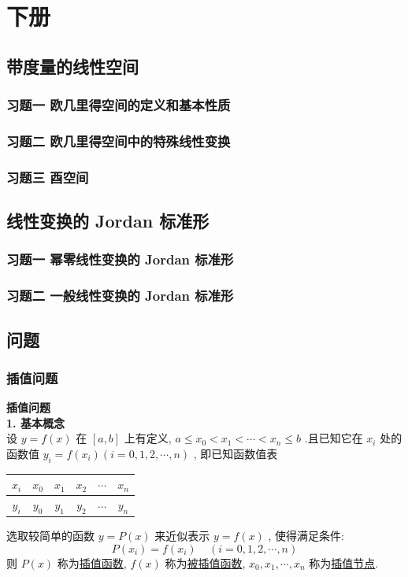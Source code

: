 \documentclass[11pt,a4paper,openany,oneside]{book}
\begin{document}
\part{下册}

\chapter{带度量的线性空间}
\section{习题一 \quad 欧几里得空间的定义和基本性质}	
\section{习题二 \quad 欧几里得空间中的特殊线性变换}
\section{习题三 \quad 酉空间}

\chapter{线性变换的 Jordan 标准形}
\section{习题一 \quad 幂零线性变换的 Jordan 标准形}	
\section{习题二 \quad 一般线性变换的 Jordan 标准形}

\chapter{问题}
\section{插值问题}
\textbf{\large{插值问题}} \\
\textbf{1. 基本概念} \\ 
设 $ y=f(x) $ 在 $ [a,b] $ 上有定义,  $ a \leq x_0 < x_1 < \cdots < x_n \leq b $ .且已知它在 $ x_i $ 处的函数值 $ y_i = f(x_i) (i=0, 1, 2, \cdots, n) $ , 即已知函数值表
\begin{center}
	\begin{tabular}{c|ccccc}
		 $ x_i $  &  $ x_0 $  &  $ x_1 $  &  $ x_2 $  &  $ \cdots $  &  $ x_n $  \\
		\hline
		 $ y_i $  &  $ y_0 $  &  $ y_1 $  &  $ y_2 $  &  $ \cdots $  &  $ y_n $  \\
	\end{tabular}
\end{center}
选取较简单的函数 $ y = P(x) $ 来近似表示 $ y = f(x) $ , 使得满足条件:
 $$  P(x_i) = f(x_i) \ \ \ \ \ (i = 0, 1, 2, \cdots, n)  $$ 
则 $ P(x) $ 称为\underline{插值函数},  $ f(x) $ 称为\underline{被插值函数},  $ x_0, x_1, \cdots, x_n $ 称为\underline{插值节点}. \\
\end{document}
